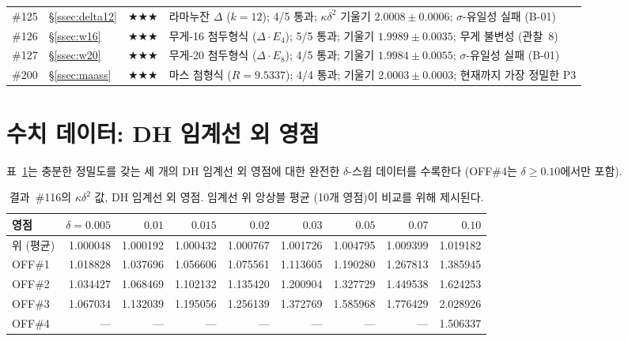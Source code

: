 \documentclass[11pt, a4paper]{article}
\theoremstyle{plain}
\theoremstyle{definition}
\begin{document}
\begin{longtable}{lllp{5.5cm}}
\#125 & \S\ref{ssec:delta12}      & \textbf{$\bigstar\bigstar\bigstar$}    & 라마누잔 $\Delta$ ($k=12$); 4/5 통과; $\kappa\delta^{2}$ 기울기 $2.0008\pm0.0006$; $\sigma$-유일성 실패 (B-01) \\
\#126 & \S\ref{ssec:w16}          & \textbf{$\bigstar\bigstar\bigstar$}    & 무게-16 첨두형식 ($\Delta\cdot E_4$); 5/5 통과; 기울기 $1.9989\pm0.0035$; 무게 불변성 (관찰~8) \\
\#127 & \S\ref{ssec:w20}          & \textbf{$\bigstar\bigstar\bigstar$}    & 무게-20 첨두형식 ($\Delta\cdot E_8$); 4/5 통과; 기울기 $1.9984\pm0.0055$; $\sigma$-유일성 실패 (B-01) \\
\#200 & \S\ref{ssec:maass}        & \textbf{$\bigstar\bigstar\bigstar$}    & 마스 첨형식 ($R{=}9.5337$); 4/4 통과; 기울기 $\mathbf{2.0003\pm0.0003}$; 현재까지 가장 정밀한 P3 \\
\end{longtable}


\section{수치 데이터: DH 임계선 외 영점}
\label{app:dhzeros}

표~\ref{tab:dhdata}는 충분한 정밀도를 갖는
세 개의 DH 임계선 외 영점에 대한 완전한 $\delta$-스윕 데이터를 수록한다
(OFF\#4는 $\delta\geq 0.10$에서만 포함).

\begin{table}[ht]
\centering
\caption{결과~\#116의 $\kappa\delta^{2}$ 값, DH 임계선 외 영점.
  임계선 위 앙상블 평균 (10개 영점)이 비교를 위해 제시된다.}
\label{tab:dhdata}
\small
\begin{tabular}{lrrrrrrrr}
\toprule
영점 & $\delta{=}0.005$ & $0.01$ & $0.015$ & $0.02$ & $0.03$ & $0.05$ & $0.07$ & $0.10$ \\
\midrule
위 (평균) & 1.000048 & 1.000192 & 1.000432 & 1.000767 & 1.001726 & 1.004795 & 1.009399 & 1.019182 \\
OFF\#1 & 1.018828 & 1.037696 & 1.056606 & 1.075561 & 1.113605 & 1.190280 & 1.267813 & 1.385945 \\
OFF\#2 & 1.034427 & 1.068469 & 1.102132 & 1.135420 & 1.200904 & 1.327729 & 1.449538 & 1.624253 \\
OFF\#3 & 1.067034 & 1.132039 & 1.195056 & 1.256139 & 1.372769 & 1.585968 & 1.776429 & 2.028926 \\
OFF\#4 & --- & --- & --- & --- & --- & --- & --- & 1.506337 \\
\bottomrule
\end{tabular}
\end{table}
\end{document}
